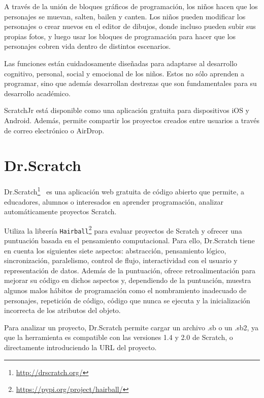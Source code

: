 \documentclass[a4paper, 12pt]{book}
\begin{document}
\vspace{5mm}
A través de la unión de bloques gráficos de programación, los niños hacen que los personajes se muevan, salten, bailen y canten.
Los niños pueden modificar los personajes o crear nuevos en el editor de dibujos, donde incluso pueden subir sus propias fotos, y luego usar los bloques de programación para hacer que los personajes cobren vida dentro de distintos escenarios.

\vspace{5mm}
Las funciones están cuidadosamente diseñadas para adaptarse al desarrollo cognitivo, personal, social y emocional de los niños.
Estos no sólo aprenden a programar, sino que además desarrollan destrezas que son fundamentales para su desarrollo académico.

\vspace{5mm}
ScratchJr está disponible como una aplicación gratuita para dispositivos iOS y Android.
Además, permite compartir los proyectos creados entre usuarios a través de correo electrónico o AirDrop.


\section{Dr.Scratch}
\label{sec:drscratch}

Dr.Scratch\footnote{\url{http://drscratch.org/}}~\cite{moreno2015dr} es una aplicación web gratuita de código abierto que permite, a educadores, alumnos o interesados en aprender programación, analizar automáticamente proyectos Scratch.

\vspace{5mm}

Utiliza la librería \texttt{Hairball}\footnote{\url{https://pypi.org/project/hairball/}} para evaluar proyectos de Scratch y ofrecer una puntuación basada en el pensamiento computacional. 
Para ello, Dr.Scratch tiene en cuenta los siguientes siete aspectos: abstracción, pensamiento lógico, sincronización, paralelismo, control de flujo, interactividad con el usuario y representación de datos. 
Además de la puntuación, ofrece retroalimentación para mejorar su código en dichos aspectos y, dependiendo de la puntuación, muestra algunos malos hábitos de programación como el nombramiento inadecuado de personajes, repetición de código, código que nunca se ejecuta y la inicialización incorrecta de los atributos del objeto.

\vspace{5mm}

Para analizar un proyecto, Dr.Scratch permite cargar un archivo .sb o un .sb2, ya que la herramienta es compatible con las versiones 1.4 y 2.0 de Scratch, o directamente introduciendo la URL del proyecto.
\end{document}
